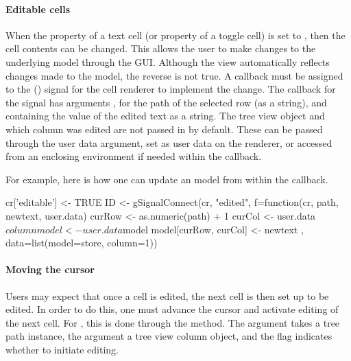 \paragraph{Editable cells} When the  property of a text
cell (or  property of a toggle cell) is set to
, then the cell contents can be changed. This allows the
user to make changes to the underlying model through the GUI. Although
the view automatically reflects changes made to the model, the reverse
is not true. A callback must be assigned to the 
() signal for the cell renderer to implement the
change. The callback for the  signal has arguments
,  for the path of the selected row (as a
string), and  containing the value of the edited text
as a string. The tree view object and which column was edited are not
passed in by default. These can be passed through the user data
argument, set as user data on the renderer, or accessed from an
enclosing environment if needed within the callback.

For example, here is how one can update an  model
from within the callback.
\begin{Schunk}
\begin{Sinput}
 cr['editable'] <- TRUE
 ID <- gSignalConnect(cr, "edited", 
 f=function(cr, path, newtext, user.data) {
   curRow <- as.numeric(path) + 1
   curCol <- user.data$column
   model <- user.data$model
   model[curRow, curCol] <- newtext
 }, data=list(model=store, column=1))
\end{Sinput}
\end{Schunk}

\paragraph{Moving the cursor}

Users may expect that once a cell is edited, the next cell is then set
up to be edited. In order to do this, one must advance the cursor and
activate editing of the next cell. For , this is
done through the  method. The
 argument takes a tree path instance, the 
argument a tree view column object, and the flag 
indicates whether to initiate editing.


